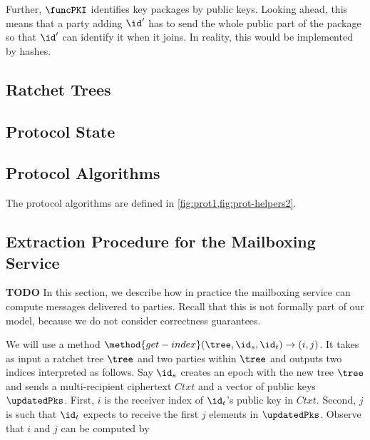 Further, $\funcPKI$ identifies key packages by public keys. Looking ahead, this means that a party adding $\id'$ has to send the whole public part of the package so that $\id'$ can identify it when it joins. In reality, this would be implemented by hashes.

\subsection{Ratchet Trees}


\subsection{Protocol State}


\subsection{Protocol Algorithms}
The protocol algorithms are defined in \cref{fig:prot1,fig:prot-helpers2}.


\subsection{Extraction Procedure for the Mailboxing Service}
{\color{red}\bf TODO}
In this section, we describe how in practice the mailboxing service can compute \saik messages delivered to parties. Recall that this is not formally part of our model, because we do not consider correctness guarantees.

We will use a method $\method{get-index}(\tree, \id_s, \id_t) \to (i, j)$. It takes as input a ratchet tree $\tree$ and two parties within $\tree$ and outputs two indices interpreted as follows. Say $\id_s$ creates an epoch with the new tree $\tree$ and sends a multi-recipient ciphertext $Ctxt$ and a vector of public keys $\updatedPks$. First, $i$ is the receiver index of $\id_t$'s public key in $Ctxt$. Second, $j$ is such that $\id_t$ expects to receive the first $j$ elements in $\updatedPks$. Observe that $i$ and $j$ can be computed by

